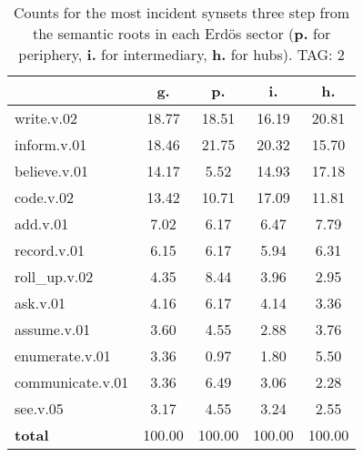 \begin{table}[h!]
\begin{center}
\begin{tabular}{| l | c | c | c | c |}\hline
 & g. & p. & i. & h. \\\hline
write.v.02 & 18.77  & 18.51  & 16.19  & 20.81 \\\hline
inform.v.01 & 18.46  & 21.75  & 20.32  & 15.70 \\\hline
believe.v.01 & 14.17  & 5.52  & 14.93  & 17.18 \\\hline
code.v.02 & 13.42  & 10.71  & 17.09  & 11.81 \\\hline
add.v.01 & 7.02  & 6.17  & 6.47  & 7.79 \\\hline
record.v.01 & 6.15  & 6.17  & 5.94  & 6.31 \\\hline
roll\_up.v.02 & 4.35  & 8.44  & 3.96  & 2.95 \\\hline
ask.v.01 & 4.16  & 6.17  & 4.14  & 3.36 \\\hline
assume.v.01 & 3.60  & 4.55  & 2.88  & 3.76 \\\hline
enumerate.v.01 & 3.36  & 0.97  & 1.80  & 5.50 \\\hline
communicate.v.01 & 3.36  & 6.49  & 3.06  & 2.28 \\\hline
see.v.05 & 3.17  & 4.55  & 3.24  & 2.55 \\\hline
{{\bf total}} & 100.00  & 100.00  & 100.00  & 100.00 \\\hline
\end{tabular}
\caption{Counts for the most incident synsets three step from the semantic roots in each Erd\"os sector ({\bf p.} for periphery, {\bf i.} for intermediary, {\bf h.} for hubs). TAG: 2}
\end{center}
\end{table}